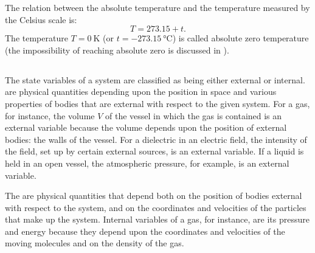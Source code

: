The relation between the absolute temperature and the tem­perature measured by the Celsius scale is: 
\begin{equation*}%
T = 273.15 + t.
\end{equation*}
The temperature $T = \SI{0}{\kelvin}$ (or $t = \SI{-273.15}{\degreeCelsius}$) is called absolute zero temperature (the impossibility of reaching absolute zero is discussed in ).

\subsection{}\label{8.3.5} The state variables of a system are classified as being either external or internal.  are physical quantities depending upon the position in space and various properties of bodies that are external with respect to the given system. For a gas, for instance, the volume $V$ of the vessel in which the gas is contained is an external variable because the volume depends upon the position of external bodies: the walls of the vessel. For a dielectric in an electric field, the intensity of the field, set up by certain external sources, is an external variable. If a liquid is held in an open vessel, the atmospheric pressure, for example, is an external variable. 

The  are physical quantities that depend both on the position of bodies external with respect to the system, and on the coordinates and velocities of the particles that make up the system. Internal variables of a gas, for instance, are its pressure and energy because they depend upon the coordinates and velocities of the moving molecules and on the density of the gas.

